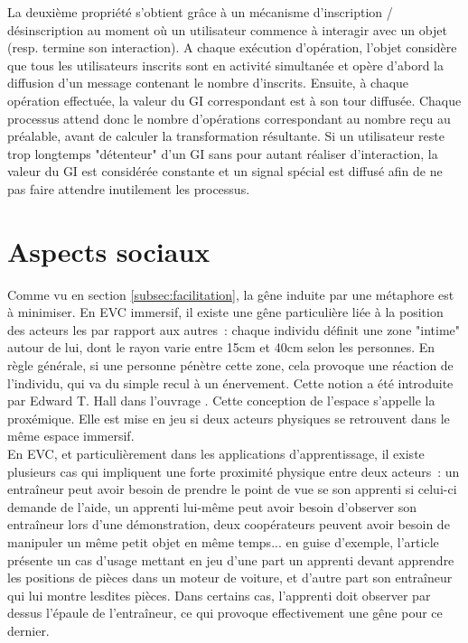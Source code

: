 \documentclass[11pt]{article}
\begin{document}
La deuxième propriété s'obtient grâce à un mécanisme d'inscription / désinscription au moment où un utilisateur commence à interagir avec un objet (resp. termine son interaction). A chaque exécution d'opération, l'objet considère que tous les utilisateurs inscrits sont en activité simultanée et opère d'abord la diffusion d'un message contenant le nombre d'inscrits. Ensuite, à chaque opération effectuée, la valeur du GI correspondant est à son tour diffusée. Chaque processus attend donc le nombre d'opérations correspondant au nombre reçu au préalable, avant de calculer la transformation résultante. Si un utilisateur reste trop longtemps "détenteur" d'un GI sans pour autant réaliser d'interaction, la valeur du GI est considérée constante et un signal spécial est diffusé afin de ne pas faire attendre inutilement les processus.

\section{Aspects sociaux}
\label{sec:social}

Comme vu en section \ref{subsec:facilitation}, la gêne induite par une métaphore est à minimiser. En EVC immersif, il existe une gêne particulière liée à la position des acteurs les par rapport aux autres~: chaque individu définit une zone "intime" autour de lui, dont le rayon varie entre 15cm et 40cm selon les personnes. En règle générale, si une personne pénètre cette zone, cela provoque une réaction de l'individu, qui va du simple recul à un énervement. Cette notion a été introduite par Edward T. Hall dans l'ouvrage \cite{proxemics}. Cette conception de l'espace s'appelle la proxémique. Elle est mise en jeu si deux acteurs physiques se retrouvent dans le même espace immersif.
\\

En EVC, et particulièrement dans les applications d'apprentissage, il existe plusieurs cas qui impliquent une forte proximité physique entre deux acteurs~: un entraîneur peut avoir besoin de prendre le point de vue se son apprenti si celui-ci demande de l'aide, un apprenti lui-même peut avoir besoin d'observer son entraîneur lors d'une démonstration, deux coopérateurs peuvent avoir besoin de manipuler un même petit objet en même temps... en guise d'exemple, l'article \cite{show-through} présente un cas d'usage mettant en jeu d'une part un apprenti devant apprendre les positions de pièces dans un moteur de voiture, et d'autre part son entraîneur qui lui montre lesdites pièces. Dans certains cas, l'apprenti doit observer par dessus l'épaule de l'entraîneur, ce qui provoque effectivement une gêne pour ce dernier.
\\
\end{document}
